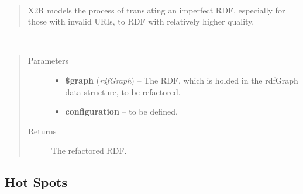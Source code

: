 \documentclass[letterpaper,10pt,english]{sphinxmanual}
\begin{document}
\begin{fulllineitems}
\label{docs/api:X2R}~\begin{quote}

X2R models the process of translating an imperfect RDF, especially for those with invalid URIs, to RDF with relatively higher quality.
\end{quote}

\begin{fulllineitems}
\label{docs/api:X2R::transform}~\begin{quote}\begin{description}
\item[{Parameters}] \leavevmode\begin{itemize}
\item {} 
\textbf{\$graph} (\emph{rdfGraph}) -- The RDF, which is holded in the rdfGraph data structure, to be refactored.

\item {} 
\textbf{configuration} -- to be defined.

\end{itemize}

\item[{Returns}] \leavevmode
The refactored RDF.

\end{description}\end{quote}

\end{fulllineitems}


\end{fulllineitems}



\subsection{Hot Spots}
\label{docs/api:hot-spots}
\end{document}
